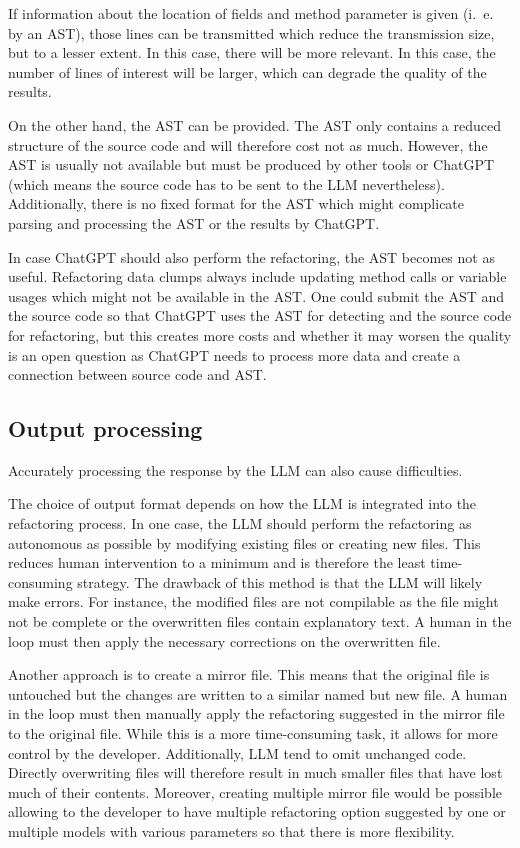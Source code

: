 If information about the location of fields and method parameter is given (i.~e. by an \ac{AST}), those lines can be transmitted which reduce the transmission size, but to a lesser extent. In this case, there will be more relevant. In this case, the number of lines of interest will be larger, which can degrade the quality of the results. 

On the other hand, the \ac{AST} can be provided. The \ac{AST} only contains a reduced structure of the source code and will therefore cost not as much. However, the \ac{AST} is usually not available but must be produced by other tools or ChatGPT (which means the source code has to be sent to the \ac{LLM} nevertheless). Additionally, there is no fixed format for the \ac{AST} which might complicate parsing and processing the \ac{AST} or the results by ChatGPT.


In case ChatGPT should also perform the refactoring, the \ac{AST} becomes not as useful. Refactoring data clumps always include updating method calls or variable usages which might not be available in the \ac{AST}. One could submit the \ac{AST} and the source code so that ChatGPT uses the \ac{AST} for detecting and the source code for refactoring, but this creates more costs and whether it may worsen the quality is an open question as ChatGPT needs to process more data and create a connection between source code and \ac{AST}.


\subsection{Output processing}
Accurately processing the response by the \ac{LLM} can also cause difficulties.

The choice of output format depends on how the \ac{LLM} is integrated into the refactoring process. In one case, the \ac{LLM} should perform the refactoring as autonomous as possible by modifying existing files or creating new files. This reduces human intervention to a minimum and is therefore the least time-consuming strategy. The drawback of this method is that the \ac{LLM} will likely make errors. For instance, the modified files are not compilable as the file might not be complete or the  overwritten files contain explanatory text. A human in the loop must then apply the necessary corrections on the overwritten file.

Another approach is to create a mirror file. This means that the original file is untouched but the changes are written to a similar named but new file. A human in the loop must then manually apply the refactoring suggested in the mirror file to the original file. While this is a more time-consuming task, it allows for more control by the developer. Additionally, \acs{LLM} tend to omit unchanged code. Directly overwriting files will therefore result in much smaller files that have lost much of their contents. Moreover, creating multiple mirror file would be possible allowing to the developer to have multiple refactoring option suggested by one or multiple models with various parameters so that there is more flexibility. 



